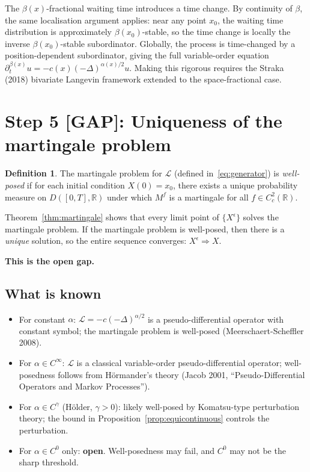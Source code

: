 \documentclass{amsart}
\theoremstyle{definition}
\newtheorem{definition}[theorem]{Definition}
\begin{document}
The $\beta(x)$-fractional waiting time introduces a time change. By continuity of $\beta$,
the same localisation argument applies: near any point $x_0$, the waiting time distribution
is approximately $\beta(x_0)$-stable, so the time change is locally the inverse
$\beta(x_0)$-stable subordinator. Globally, the process is time-changed by a
position-dependent subordinator, giving the full variable-order equation
$\partial_t^{\beta(x)} u = -c(x)(-\Delta)^{\alpha(x)/2} u$. Making this rigorous
requires the Straka (2018) bivariate Langevin framework extended to the
space-fractional case.

\section{Step 5 [GAP]: Uniqueness of the martingale problem}

\begin{definition}
The martingale problem for $\mathcal{L}$ (defined in~\eqref{eq:generator}) is
\emph{well-posed} if for each initial condition $X(0) = x_0$, there exists a unique
probability measure on $D([0,T], \mathbb{R})$ under which $M^f$ is a martingale for
all $f \in C^2_c(\mathbb{R})$.
\end{definition}

Theorem~\ref{thm:martingale} shows that every limit point of $\{X^\epsilon\}$ solves
the martingale problem. If the martingale problem is well-posed, then there is a
\emph{unique} solution, so the entire sequence converges: $X^\epsilon \Rightarrow X$.

\textbf{This is the open gap.}

\subsection{What is known}
\begin{itemize}
    \item For constant $\alpha$: $\mathcal{L} = -c(-\Delta)^{\alpha/2}$ is a
          pseudo-differential operator with constant symbol; the martingale problem
          is well-posed (Meerschaert-Scheffler 2008).
    \item For $\alpha \in C^\infty$: $\mathcal{L}$ is a classical variable-order
          pseudo-differential operator; well-posedness follows from Hörmander's theory
          (Jacob 2001, ``Pseudo-Differential Operators and Markov Processes'').
    \item For $\alpha \in C^\gamma$ (Hölder, $\gamma > 0$): likely well-posed by
          Komatsu-type perturbation theory; the bound in
          Proposition~\ref{prop:equicontinuous} controls the perturbation.
    \item For $\alpha \in C^0$ only: \textbf{open}. Well-posedness may fail, and
          $C^0$ may not be the sharp threshold.
\end{itemize}
\end{document}
